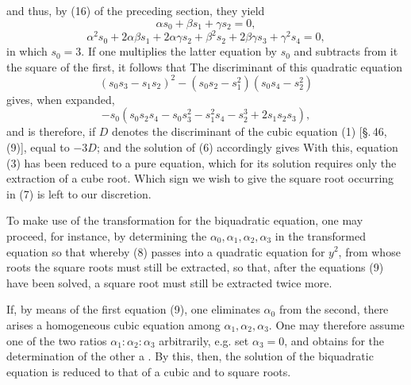 
and thus, by (16) of the preceding section, they yield
\[
\alpha s_0 + \beta s_1 + \gamma s_2 = 0,
\]
\[
\alpha^2 s_0 + 2\alpha\beta s_1 + 2\alpha\gamma s_2 + \beta^2 s_2 + 2\beta\gamma s_3 + \gamma^2 s_4 = 0,
\]
in which $s_0 = 3$. If one multiplies the latter equation by $s_0$ and subtracts from it the square of the first, it follows that
The discriminant of this quadratic equation
\[
(s_0 s_3 - s_1 s_2)^2 - (s_0 s_2 - s_1^2)(s_0 s_4 - s_2^2)
\]
gives, when expanded,
\[
-s_0(s_0 s_2 s_4 - s_0 s_3^2 - s_1^2 s_4 - s_2^3 + 2 s_1 s_2 s_3),
\]
and is therefore, if $D$ denotes the discriminant of the cubic equation (1) [\S.\,46, (9)], equal to $-3D$; and the solution of (6) accordingly gives
With this, equation (3) has been reduced to a pure equation, which for its solution requires only the extraction of a cube root. Which sign we wish to give the square root occurring in (7) is left to our discretion.

To make use of the  transformation for the biquadratic equation, one may proceed, for instance, by determining the $\alpha_0, \alpha_1, \alpha_2, \alpha_3$ in the transformed equation
so that
whereby (8) passes into a quadratic equation for $y^2$, from whose roots the square roots must still be extracted, so that, after the equations (9) have been solved, a square root must still be extracted twice more.

If, by means of the first equation (9), one eliminates $\alpha_0$ from the second, there arises a homogeneous cubic equation among $\alpha_1, \alpha_2, \alpha_3$. One may therefore assume one of the two ratios $\alpha_1:\alpha_2:\alpha_3$ arbitrarily, e.g. set $\alpha_3 = 0$, and obtains for the determination of the other a . By this, then, the solution of the biquadratic equation is reduced to that of a cubic and to square roots.
